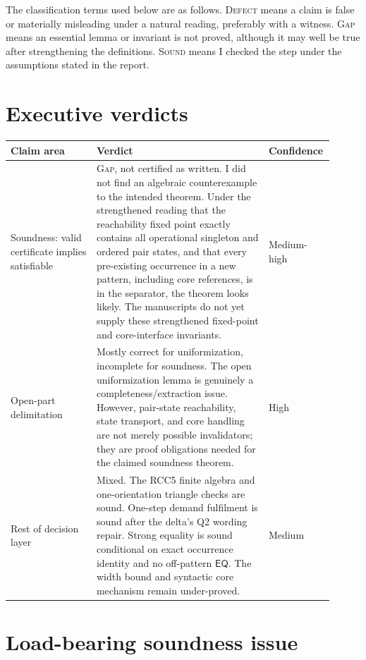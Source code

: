 \documentclass[11pt]{article}
\newcommand{\EQ}{\ensuremath{\mathsf{EQ}}}
\newcommand{\cert}[1]{\textsc{#1}}
\begin{document}
The classification terms used below are as follows.  \cert{Defect} means a claim is false or materially misleading under a natural reading, preferably with a witness.  \cert{Gap} means an essential lemma or invariant is not proved, although it may well be true after strengthening the definitions.  \cert{Sound} means I checked the step under the assumptions stated in the report.

\section{Executive verdicts}

\begin{longtable}{>{\raggedright\arraybackslash}p{0.26\linewidth} >{\raggedright\arraybackslash}p{0.52\linewidth} >{\raggedright\arraybackslash}p{0.13\linewidth}}
\toprule
\textbf{Claim area} & \textbf{Verdict} & \textbf{Confidence} \\
\midrule
Soundness: valid certificate implies satisfiable & \cert{Gap}, not certified as written.  I did not find an algebraic counterexample to the intended theorem.  Under the strengthened reading that the reachability fixed point exactly contains all operational singleton and ordered pair states, and that every pre-existing occurrence in a new pattern, including core references, is in the separator, the theorem looks likely.  The manuscripts do not yet supply these strengthened fixed-point and core-interface invariants. & Medium-high \\
\addlinespace
Open-part delimitation & Mostly correct for uniformization, incomplete for soundness.  The open uniformization lemma is genuinely a completeness/extraction issue.  However, pair-state reachability, state transport, and core handling are not merely possible invalidators; they are proof obligations needed for the claimed soundness theorem. & High \\
\addlinespace
Rest of decision layer & Mixed.  The RCC5 finite algebra and one-orientation triangle checks are sound.  One-step demand fulfilment is sound after the delta's Q2 wording repair.  Strong equality is sound conditional on exact occurrence identity and no off-pattern \EQ.  The width bound and syntactic core mechanism remain under-proved. & Medium \\
\bottomrule
\end{longtable}

\section{Load-bearing soundness issue}
\end{document}
